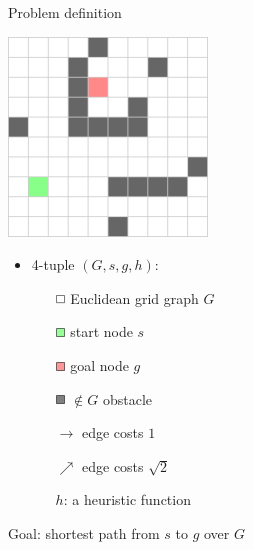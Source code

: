 \documentclass{presentation}
\begin{document}
\begin{frame}{Problem definition}
	\begin{minipage}{0.3\textwidth}

	\includegraphics[width=\textwidth]{figures/gridgraph.png}
	
	\end{minipage}%
	\hfill%
	\begin{minipage}{0.6\textwidth}
	

	\begin{itemize}
		\item 4-tuple $(G, s, g, h)$:
		\pause
		\begin{itemize}
		\item[$\tikz{\path[draw=black,fill=white] (0,0) rectangle (2mm,2mm);}$] Euclidean grid graph $G$
		\item[$\tikz{\path[draw=black,fill=white!60!green] (0,0) rectangle (2mm,2mm);}$] start node $s$
		\item[$\tikz{\path[draw=black,fill=white!60!red] (0,0) rectangle (2mm,2mm);}$] goal node $g$
		\item[$\tikz{\path[draw=black,fill=gray] (0,0) rectangle (2mm,2mm);}$] $\not\in G$ obstacle
		\pause
		\item[$\rightarrow$] edge costs $1$
		\item[$\nearrow$] edge costs $\sqrt{2}$
		\pause
		\item[$h$:] a heuristic function
		\end{itemize}
	\end{itemize}
	
	\end{minipage}
	
	\hspace{3cm}
	
	\pause
	\begin{center}
		Goal: shortest path from $s$ to $g$ over $G$
	\end{center}

\end{frame}
\end{document}

